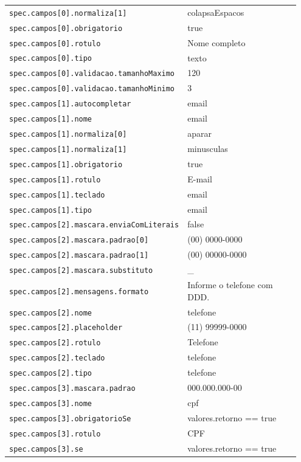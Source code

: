 \begin{tabular}{@{}p{0.35\linewidth}p{0.6\linewidth}@{}}
\texttt{spec.campos[0].normaliza[1]} & colapsaEspacos \\
\texttt{spec.campos[0].obrigatorio} & true \\
\texttt{spec.campos[0].rotulo} & Nome completo \\
\texttt{spec.campos[0].tipo} & texto \\
\texttt{spec.campos[0].validacao.tamanhoMaximo} & 120 \\
\texttt{spec.campos[0].validacao.tamanhoMinimo} & 3 \\
\texttt{spec.campos[1].autocompletar} & email \\
\texttt{spec.campos[1].nome} & email \\
\texttt{spec.campos[1].normaliza[0]} & aparar \\
\texttt{spec.campos[1].normaliza[1]} & minusculas \\
\texttt{spec.campos[1].obrigatorio} & true \\
\texttt{spec.campos[1].rotulo} & E-mail \\
\texttt{spec.campos[1].teclado} & email \\
\texttt{spec.campos[1].tipo} & email \\
\texttt{spec.campos[2].mascara.enviaComLiterais} & false \\
\texttt{spec.campos[2].mascara.padrao[0]} & (00) 0000-0000 \\
\texttt{spec.campos[2].mascara.padrao[1]} & (00) 00000-0000 \\
\texttt{spec.campos[2].mascara.substituto} & \_ \\
\texttt{spec.campos[2].mensagens.formato} & Informe o telefone com DDD. \\
\texttt{spec.campos[2].nome} & telefone \\
\texttt{spec.campos[2].placeholder} & (11) 99999-0000 \\
\texttt{spec.campos[2].rotulo} & Telefone \\
\texttt{spec.campos[2].teclado} & telefone \\
\texttt{spec.campos[2].tipo} & telefone \\
\texttt{spec.campos[3].mascara.padrao} & 000.000.000-00 \\
\texttt{spec.campos[3].nome} & cpf \\
\texttt{spec.campos[3].obrigatorioSe} & valores.retorno == true \\
\texttt{spec.campos[3].rotulo} & CPF \\
\texttt{spec.campos[3].se} & valores.retorno == true \\

\end{tabular}
